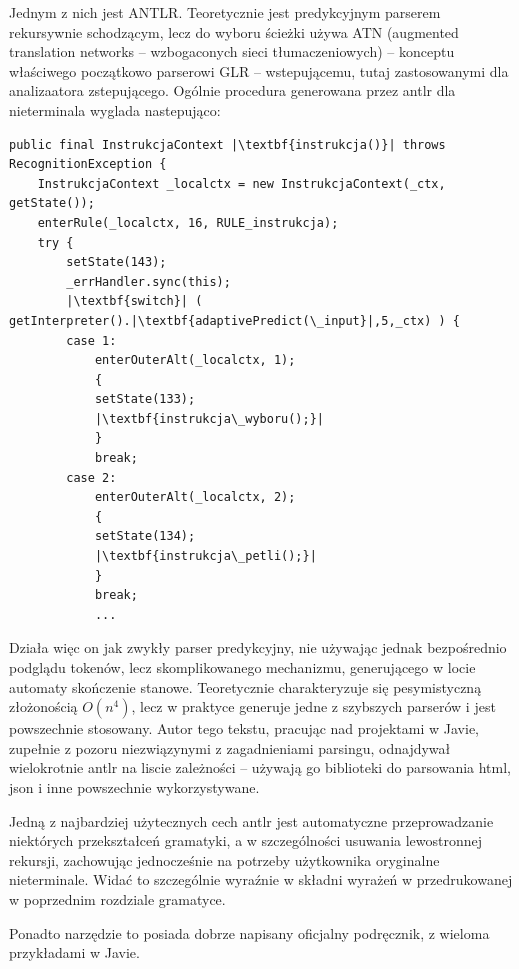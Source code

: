 Jednym z nich jest ANTLR. Teoretycznie jest predykcyjnym parserem rekursywnie schodzącym, lecz do wyboru ścieżki używa ATN (augmented translation networks – wzbogaconych sieci tłumaczeniowych) – konceptu właściwego początkowo parserowi GLR – wstepującemu, tutaj zastosowanymi dla analizaatora zstepującego.
Ogólnie procedura generowana przez antlr dla nieterminala wyglada nastepująco:
\lstset{
    escapechar=|,
    breaklines=true
}
\begin{lstlisting}
public final InstrukcjaContext |\textbf{instrukcja()}| throws RecognitionException {
    InstrukcjaContext _localctx = new InstrukcjaContext(_ctx, getState());
    enterRule(_localctx, 16, RULE_instrukcja);
    try {
        setState(143);
        _errHandler.sync(this);
        |\textbf{switch}| ( getInterpreter().|\textbf{adaptivePredict(\_input}|,5,_ctx) ) {
        case 1:
            enterOuterAlt(_localctx, 1);
            {
            setState(133);
            |\textbf{instrukcja\_wyboru();}|
            }
            break;
        case 2:
            enterOuterAlt(_localctx, 2);
            {
            setState(134);
            |\textbf{instrukcja\_petli();}|
            }
            break;
            ...
\end{lstlisting}
Działa więc on jak zwykły parser predykcyjny, nie używając jednak bezpośrednio podglądu tokenów, lecz skomplikowanego mechanizmu, generującego w locie automaty skończenie stanowe\cite{PARR_2014}. Teoretycznie charakteryzuje się pesymistyczną złożonością $O(n^4)$, lecz w praktyce generuje jedne z szybszych parserów i jest powszechnie stosowany. Autor tego tekstu, pracując nad projektami w Javie, zupełnie z pozoru niezwiązynymi z zagadnieniami parsingu, odnajdywał wielokrotnie antlr na liscie zależności – używają go biblioteki do parsowania html, json i inne powszechnie wykorzystywane.

Jedną z najbardziej użytecznych cech antlr jest automatyczne przeprowadzanie niektórych przekształceń gramatyki, a w szczególności usuwania lewostronnej rekursji, zachowując jednocześnie na potrzeby użytkownika oryginalne nieterminale. Widać to szczególnie wyraźnie w składni wyrażeń w przedrukowanej w poprzednim rozdziale gramatyce.

Ponadto narzędzie to posiada dobrze napisany oficjalny podręcznik\cite{Definitive_antlr_reference}, z wieloma przykładami w Javie. 

